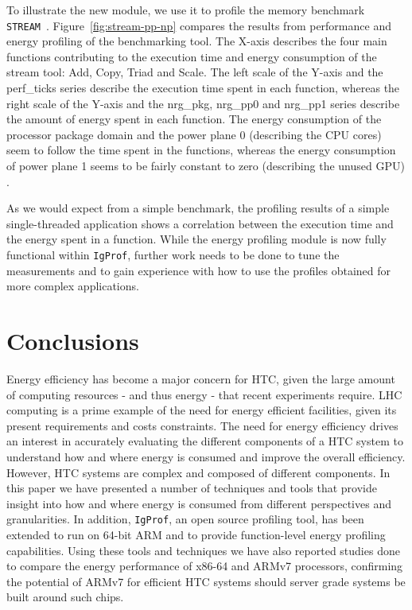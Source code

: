 To illustrate the new module, we use it to profile the memory
benchmark \texttt{STREAM}~\cite{stream-web}. Figure~\ref{fig:stream-pp-np}
compares the results from performance and energy profiling of the
benchmarking tool. The X-axis describes the four main functions
contributing to the execution time and energy consumption of the
stream tool: Add, Copy, Triad and Scale. The left scale of the
Y-axis and the perf\_ticks series describe the execution time spent
in each function, whereas the right scale of the Y-axis and the
nrg\_pkg, nrg\_pp0 and nrg\_pp1 series describe the amount of energy
spent in each function. The energy consumption of the processor
package domain and the power plane 0 (describing the CPU cores)
seem to follow the time spent in the functions, whereas the energy
consumption of power plane 1 seems to be fairly constant to zero
(describing the unused GPU) .

As we would expect from a simple benchmark, the profiling results of
a simple single-threaded application shows a correlation between
the execution time and the energy spent in a function.
While the energy profiling module is now fully functional within 
\texttt{IgProf}, further work needs to be done to tune the measurements 
and to gain experience with how to use the profiles obtained for
more complex applications.

\section{Conclusions}

Energy efficiency has become a major concern for HTC, given the large
amount of computing resources - and thus energy - that recent experiments
require. LHC computing is a prime example of the need for energy
efficient facilities, given its present requirements and costs
constraints. The need for energy efficiency drives an interest
in accurately evaluating the different components of a HTC system
to understand how and where energy is consumed
and improve the overall efficiency. However, HTC systems are complex
and composed of different components. In this paper we have presented
a number of techniques and tools that provide insight into how and
where energy is consumed from different perspectives and granularities.
In addition, \texttt{IgProf}, an open source profiling tool, has been
extended
to run on 64-bit ARM and to provide function-level energy profiling capabilities. 
Using these tools and techniques we have also reported studies done to
compare the energy performance of x86-64 and ARMv7 processors, confirming
the potential of ARMv7 for efficient HTC systems should server grade
systems be built around such chips.


